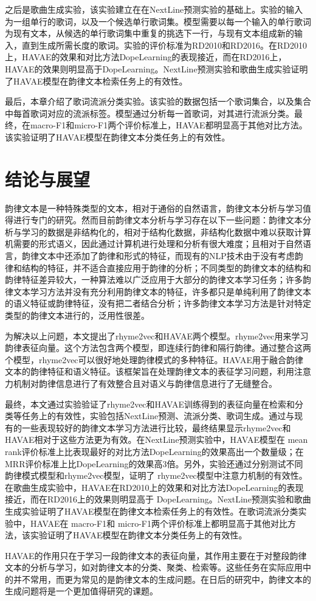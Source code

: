 之后是歌曲生成实验，该实验建立在在NextLine预测实验的基础上。实验的输入为一组单行的歌词，以及一个候选单行歌词集。模型需要以每一个输入的单行歌词为现有文本，从候选的单行歌词集中重复的挑选下一行，与现有文本组成新的输入，直到生成所需长度的歌词。实验的评价标准为RD2010和RD2016。在RD2010上，HAVAE的效果和对比方法DopeLearning的表现接近，而在RD2016上，HAVAE的效果则明显高于DopeLearning。NextLine预测实验和歌曲生成实验证明了HAVAE模型在韵律文本检索任务上的有效性。\par

最后，本章介绍了歌词流派分类实验。该实验的数据包括一个歌词集合，以及集合中每首歌词对应的流派标签。模型通过分析每一首歌词，对其进行流派分类。最终，在macro-F1和micro-F1两个评价标准上，HAVAE都明显高于其他对比方法。该实验证明了HAVAE模型在韵律文本分类任务上的有效性。\par

\chapter{结论与展望} \label{chpt:conclusion}
韵律文本是一种特殊类型的文本，相对于通俗的自然语言，韵律文本分析与学习值得进行专门的研究。然而目前韵律文本分析与学习存在以下一些问题：韵律文本分析与学习的数据是非结构化的，相对于结构化数据，非结构化数据中难以获取计算机需要的形式语义，因此通过计算机进行处理和分析有很大难度；且相对于自然语言，韵律文本中还添加了韵律和形式的特征，而现有的NLP技术由于没有考虑韵律和结构的特征，并不适合直接应用于韵律的分析；不同类型的韵律文本的结构和韵律特征差异较大，一种算法难以广泛应用于大部分的韵律文本学习任务；许多韵律文本学习方法并没有充分利用韵律文本的特征，许多都只是单纯利用了韵律文本的语义特征或韵律特征，没有把二者结合分析；许多韵律文本学习方法是针对特定类型的韵律文本进行的，泛用性很差。\par

为解决以上问题，本文提出了rhyme2vec和HAVAE两个模型。rhyme2vec用来学习韵律表征向量。这个方法包含两个模型，即连续行韵律和隔行韵律。通过整合这两个模型，rhyme2vec可以很好地处理韵律模式的多种特征。HAVAE用于融合韵律文本的韵律特征和语义特征。该框架旨在处理韵律文本的表征学习问题，利用注意力机制对韵律信息进行了有效整合且对语义与韵律信息进行了无缝整合。\par

最终，本文通过实验验证了rhyme2vec和HAVAE训练得到的表征向量在检索和分类等任务上的有效性，实验包括NextLine预测、流派分类、歌词生成。通过与现有的一些表现较好的韵律文本学习方法进行比较，最终结果显示rhyme2vec和HAVAE相对于这些方法更为有效。在NextLine预测实验中，HAVAE模型在 mean rank评价标准上比表现最好的对比方法DopeLearning的效果高出一个数量级；在 MRR评价标准上比DopeLearning的效果高3倍。另外，实验还通过分别测试不同韵律模式模型和rhyme2vec模型，证明了 rhyme2vec模型中注意力机制的有效性。在歌曲生成实验中，HAVAE在RD2010上的效果和对比方法DopeLearning的表现接近，而在RD2016上的效果则明显高于 DopeLearning。NextLine预测实验和歌曲生成实验证明了HAVAE模型在韵律文本检索任务上的有效性。在歌词流派分类实验中，HAVAE在 macro-F1和 micro-F1两个评价标准上都明显高于其他对比方法，该实验证明了HAVAE模型在韵律文本分类任务上的有效性。\par

HAVAE的作用只在于学习一段韵律文本的表征向量，其作用主要在于对整段韵律文本的分析与学习，如对韵律文本的分类、聚类、检索等。这些任务在实际应用中的并不常用，而更为常见的是韵律文本的生成问题。在日后的研究中，韵律文本的生成问题将是一个更加值得研究的课题。\par

